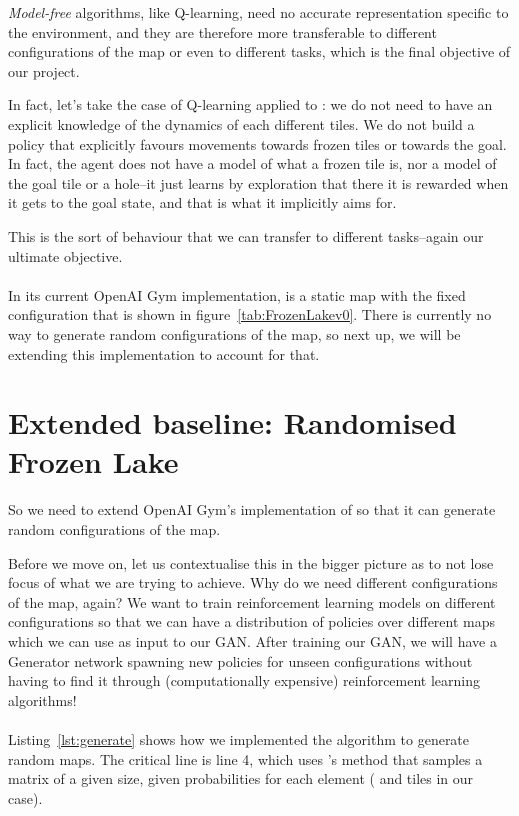 \emph{Model-free} algorithms, like Q-learning, need no accurate representation specific to the environment, and they are therefore more transferable to different configurations of the map or even to different tasks, which is the final objective of our project.

In fact, let's take the case of Q-learning applied to : we do not need to have an explicit knowledge of the dynamics of each different tiles. We do not build a policy that explicitly favours movements towards frozen tiles or towards the goal. In fact, the agent does not have a model of what a frozen tile is, nor a model of the goal tile or a hole--it just learns by exploration that there it is rewarded when it gets to the goal state, and that is what it implicitly aims for.

This is the sort of behaviour that we can transfer to different tasks--again our ultimate objective.
\\\\
In its current OpenAI Gym implementation,  is a static map with the fixed configuration that is shown in figure~\ref{tab:FrozenLakev0}. There is currently no way to generate random configurations of the map, so next up, we will be extending this implementation to account for that.

\section{Extended baseline: Randomised Frozen Lake}
\label{ExtendedBaseline}
So we need to extend OpenAI Gym's implementation of  so that it can generate random configurations of the map.

Before we move on, let us contextualise this in the bigger picture as to not lose focus of what we are trying to achieve. Why do we need different configurations of the map, again? We want to train reinforcement learning models on different configurations so that we can have a distribution of policies over different maps which we can use as input to our GAN. After training our GAN, we will have a Generator network spawning new policies for unseen configurations without having to find it through (computationally expensive) reinforcement learning algorithms!
\\\\
Listing~\ref{lst:generate} shows how we implemented the algorithm to generate random maps. The critical line is line 4, which uses 's  method that samples a matrix of a given size, given probabilities for each element ( and  tiles in our case).


